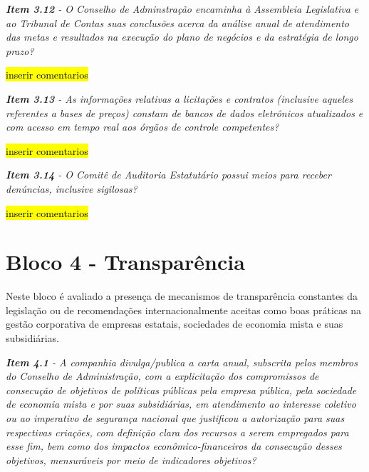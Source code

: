 \begin{framed}
\noindent\textit{\textbf{Item 3.12} - O Conselho de Adminstração encaminha à Assembleia Legislativa e ao Tribunal de Contas suas conclusões acerca da análise anual de atendimento das metas e resultados na execução do plano de negócios e da estratégia de longo prazo?}
\end{framed}

\hl{inserir comentarios}

\begin{framed}
\noindent\textit{\textbf{Item 3.13} - As informações relativas a licitações e contratos (inclusive aqueles referentes a bases de preços) constam de bancos de dados eletrônicos atualizados e com acesso em tempo real aos órgãos de controle competentes?}
\end{framed}

\hl{inserir comentarios}

\begin{framed}
\noindent\textit{\textbf{Item 3.14} - O Comitê de Auditoria Estatutário possui meios para receber denúncias, inclusive sigilosas?}
\end{framed}

\hl{inserir comentarios}

\section{Bloco 4 - Transparência}
Neste bloco é avaliado a presença de mecanismos de transparência constantes da legislação ou de recomendações internacionalmente aceitas como boas práticas na gestão corporativa de empresas estatais, sociedades de economia mista e suas subsidiárias.

\begin{framed}
\noindent\textit{\textbf{Item 4.1} - A companhia divulga/publica a carta anual, subscrita pelos membros do Conselho de Administração, com a explicitação dos compromissos de consecução de objetivos de políticas públicas pela empresa pública, pela sociedade de economia mista e por suas subsidiárias, em atendimento ao interesse coletivo ou ao imperativo de segurança nacional que justificou a autorização para suas respectivas criações, com definição clara dos recursos a serem empregados para esse fim, bem como dos impactos econômico-financeiros da consecução desses objetivos, mensuráveis por meio de indicadores objetivos?}
\end{framed}


